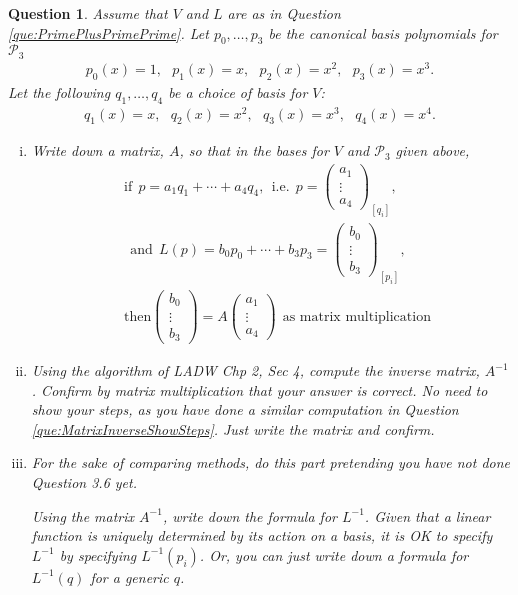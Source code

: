 \documentclass[12pt]{article}
\newtheorem{question}[thm]{Question}
\def\P{\mathcal P}
\newcommand{\ColVecThree}[3]{\begin{pmatrix} #1\\ #2\\ #3\end{pmatrix}}
\begin{document}
\vspace{1cm}

\begin{question}
	\normalfont
	
	Assume that $V$ and $L$ are as in Question \ref{que:PrimePlusPrimePrime}. Let $p_0,\dots, p_3$ be the canonical basis polynomials for $\P_3$
	\begin{align*}
		p_0(x) = 1,\ \ \ 
		p_1(x) = x,\ \ \
		p_2(x) = x^2,\ \ \ 
		p_3(x) = x^3.
	\end{align*}
	Let the following $q_1,\dots, q_4$ be a choice of basis for $V$:
	\begin{align*}
		q_1(x) = x,\ \ \
		q_2(x) = x^2,\ \ \ 
		q_3(x) = x^3,\ \ \ 
		q_4(x) = x^4.
	\end{align*}
	
	\begin{enumerate}[(i)]
		\item Write down a matrix, $A$, so that in the bases for $V$ and $\P_3$ given above,
		\begin{align*}
			&\text{if}\ \ 
			p = a_1q_1+ \cdots + a_4 q_4,\ \ \text{i.e.}\ \ p=\ColVecThree{a_1}{\vdots}{a_4}_{[q_i]},\\
			&\ \ \text{and}\ \ 
			L(p) = b_0p_0 + \cdots + b_3p_3 = \ColVecThree{b_0}{\vdots}{b_3}_{[p_i]},\\
			&\text{then}
			\ColVecThree{b_0}{\vdots}{b_3}
			= A\ColVecThree{a_1}{\vdots}{a_4}\ \ \text{as matrix multiplication}
		\end{align*}
		
		\item Using the algorithm of LADW Chp 2, Sec 4, compute the inverse matrix, $A^{-1}$.  Confirm by matrix multiplication that your answer is correct.  No need to show your steps, as you have done a similar computation in Question \ref{que:MatrixInverseShowSteps}.  Just write the matrix and confirm.
		
		\item  For the sake of comparing methods, do this part pretending you have not done Question 3.6 yet.
		
		
		 Using the matrix $A^{-1}$, write down the formula for $L^{-1}$.  Given that a linear function is uniquely determined by its action on a basis, it is OK to specify $L^{-1}$ by specifying $L^{-1}(p_i)$.  Or, you can just write down a formula for $L^{-1}(q)$ for a generic $q$.
	\end{enumerate}
\end{question}







\end{document}
